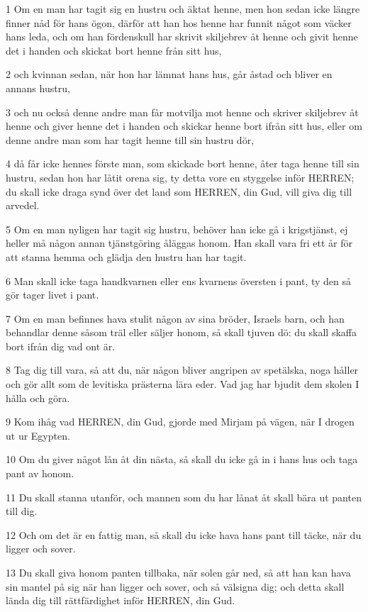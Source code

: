 \par 1 Om en man har tagit sig en hustru och äktat henne, men hon sedan icke längre finner nåd för hans ögon, därför att han hos henne har funnit något som väcker hans leda, och om han fördenskull har skrivit skiljebrev åt henne och givit henne det i handen och skickat bort henne från sitt hus,
\par 2 och kvinnan sedan, när hon har lämnat hans hus, går åstad och bliver en annans hustru,
\par 3 och nu också denne andre man får motvilja mot henne och skriver skiljebrev åt henne och giver henne det i handen och skickar henne bort ifrån sitt hus, eller om denne andre man som har tagit henne till sin hustru dör,
\par 4 då får icke hennes förste man, som skickade bort henne, åter taga henne till sin hustru, sedan hon har låtit orena sig, ty detta vore en styggelse inför HERREN; du skall icke draga synd över det land som HERREN, din Gud, vill giva dig till arvedel.
\par 5 Om en man nyligen har tagit sig hustru, behöver han icke gå i krigstjänst, ej heller må någon annan tjänstgöring åläggas honom. Han skall vara fri ett år för att stanna hemma och glädja den hustru han har tagit.
\par 6 Man skall icke taga handkvarnen eller ens kvarnens översten i pant, ty den så gör tager livet i pant.
\par 7 Om en man befinnes hava stulit någon av sina bröder, Israels barn, och han behandlar denne såsom träl eller säljer honom, så skall tjuven dö: du skall skaffa bort ifrån dig vad ont är.
\par 8 Tag dig till vara, så att du, när någon bliver angripen av spetälska, noga håller och gör allt som de levitiska prästerna lära eder. Vad jag har bjudit dem skolen I hålla och göra.
\par 9 Kom ihåg vad HERREN, din Gud, gjorde med Mirjam på vägen, när I drogen ut ur Egypten.
\par 10 Om du giver något lån åt din nästa, så skall du icke gå in i hans hus och taga pant av honom.
\par 11 Du skall stanna utanför, och mannen som du har lånat åt skall bära ut panten till dig.
\par 12 Och om det är en fattig man, så skall du icke hava hans pant till täcke, när du ligger och sover.
\par 13 Du skall giva honom panten tillbaka, när solen går ned, så att han kan hava sin mantel på sig när han ligger och sover, och så välsigna dig; och detta skall lända dig till rättfärdighet inför HERREN, din Gud.
